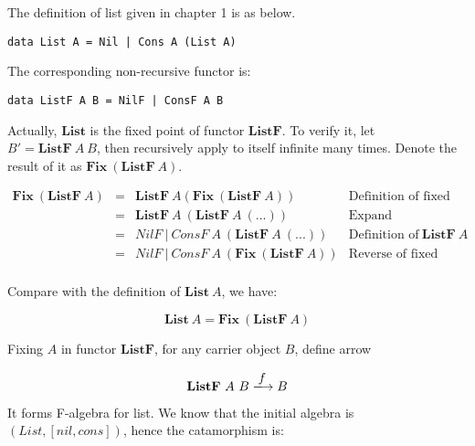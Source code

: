 \documentclass{article}
\begin{document}
\begin{example}
\normalfont
The definition of list given in chapter 1 is as below.

\lstset{frame=none}
\begin{lstlisting}
data List A = Nil | Cons A (List A)
\end{lstlisting}

The corresponding non-recursive functor is:

\begin{lstlisting}
data ListF A B = NilF | ConsF A B
\end{lstlisting}

Actually, $\mathbf{List}$ is the fixed point of functor $\mathbf{ListF}$. To verify it, let $B' = \mathbf{ListF}\ A\ B$, then recursively apply to itself infinite many times. Denote the result of it as $\mathbf{Fix}\ (\mathbf{ListF}\ A)$.

\[
\begin{array}{rcll}
\mathbf{Fix}\ (\mathbf{ListF}\ A)
& = & \mathbf{ListF}\ A (\mathbf{Fix}\ (\mathbf{ListF}\ A)) & \text{Definition of fixed point} \\
& = & \mathbf{ListF}\ A\ (\mathbf{ListF}\ A\ (...)) & \text{Expand} \\
& = & NilF\ |\ ConsF\ A\ (\mathbf{ListF}\ A\ (...)) & \text{Definition of}\ \mathbf{ListF}\ A \\
& = & NilF\ |\ ConsF\ A\ (\mathbf{Fix}\ (\mathbf{ListF}\ A)) & \text{Reverse of fixed point} \\
\end{array}
\]

Compare with the definition of $\mathbf{List}\ A$, we have:

\[
\mathbf{List}\ A = \mathbf{Fix}\ (\mathbf{ListF}\ A)
\]

Fixing $A$ in functor $\mathbf{ListF}$, for any carrier object $B$, define arrow

\[
\mathbf{ListF}\ A\ B \arrowto{f} B
\]

It forms F-algebra for list. We know that the initial algebra is $(List, [nil, cons])$, hence the catamorphism is:

\begin{center}
\end{center}


\end{example}
\end{document}
